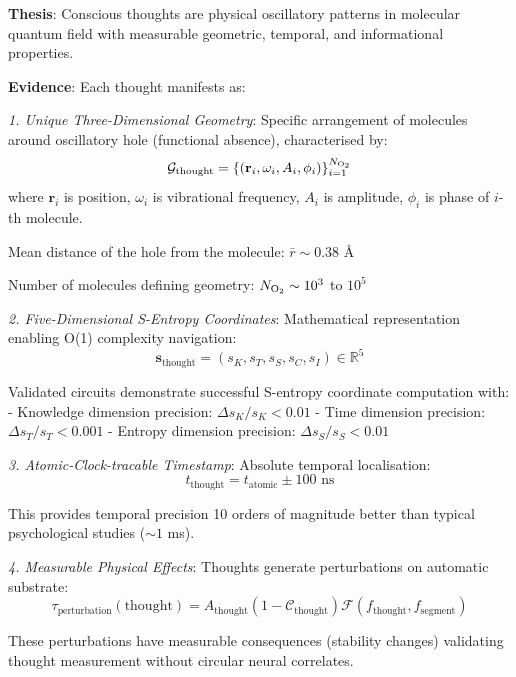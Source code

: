\documentclass[11pt,onecolumn]{article}
\begin{document}
\textbf{Thesis}: Conscious thoughts are physical oscillatory patterns in  molecular quantum field with measurable geometric, temporal, and informational properties.

\textbf{Evidence}: Each thought manifests as:

\textit{1. Unique Three-Dimensional Geometry}: Specific arrangement of  molecules around oscillatory hole (functional absence), characterised by:
\begin{equation}
\mathcal{G}_{\text{thought}} = \{(\mathbf{r}_i, \omega_i, A_i, \phi_i)\}_{i=1}^{N_{\ce{O2}}}
\end{equation}
where $\mathbf{r}_i$ is position, $\omega_i$ is vibrational frequency, $A_i$ is amplitude, $\phi_i$ is phase of $i$-th  molecule.

Mean distance of the hole from the molecule: $\bar{r} \sim 0.38$ \AA

Number of molecules defining geometry: $N_{\ce{O2}} \sim 10^3$ to $10^5$

\textit{2. Five-Dimensional S-Entropy Coordinates}: Mathematical representation enabling O(1) complexity navigation:
\begin{equation}
\mathbf{s}_{\text{thought}} = (s_K, s_T, s_S, s_C, s_I) \in \mathbb{R}^5
\end{equation}

Validated circuits demonstrate successful S-entropy coordinate computation with:
- Knowledge dimension precision: $\Delta s_K / s_K < 0.01$
- Time dimension precision: $\Delta s_T / s_T < 0.001$
- Entropy dimension precision: $\Delta s_S / s_S < 0.01$

\textit{3. Atomic-Clock-tracable Timestamp}: Absolute temporal localisation:
\begin{equation}
t_{\text{thought}} = t_{\text{atomic}} \pm 100 \text{ ns}
\end{equation}

This provides temporal precision 10 orders of magnitude better than typical psychological studies ($\sim 1$ ms).

\textit{4. Measurable Physical Effects}: Thoughts generate perturbations on automatic substrate:
\begin{equation}
\tau_{\text{perturbation}}(\text{thought}) = A_{\text{thought}} (1 - \mathcal{C}_{\text{thought}}) \mathcal{F}(f_{\text{thought}}, f_{\text{segment}})
\end{equation}

These perturbations have measurable consequences (stability changes) validating thought measurement without circular neural correlates.
\end{document}
